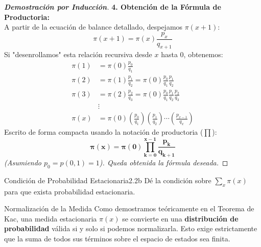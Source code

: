 \documentclass[10pt,a4paper]{article}
\begin{document}
\begin{proof}[\textbf{Demostración por Inducción}]
    \vspace{3mm}
    \textbf{4. Obtención de la Fórmula de Productoria:} \\
    A partir de la ecuación de balance detallado, despejamos $\pi(x+1)$:
    \[ \pi(x+1) = \pi(x) \frac{p_x}{q_{x+1}} \]
    Si "desenrollamos" esta relación recursiva desde $x$ hasta $0$, obtenemos:
    \begin{align*}
        \pi(1) &= \pi(0) \frac{p_0}{q_1} \\
        \pi(2) &= \pi(1) \frac{p_1}{q_2} = \pi(0) \frac{p_0}{q_1} \frac{p_1}{q_2} \\
        \pi(3) &= \pi(2) \frac{p_2}{q_3} = \pi(0) \frac{p_0}{q_1} \frac{p_1}{q_2} \frac{p_2}{q_3} \\
        &\vdots \\
        \pi(x) &= \pi(0) \left( \frac{p_0}{q_1} \right) \left( \frac{p_1}{q_2} \right) \cdots \left( \frac{p_{x-1}}{q_x} \right)
    \end{align*}
    Escrito de forma compacta usando la notación de productoria ($\prod$):
    \[ \mathbf{\pi(x) = \pi(0) \prod_{k=0}^{x-1} \frac{p_k}{q_{k+1}}} \]
    \textit{(Asumiendo $p_0 = p(0,1) = 1$). Queda obtenida la fórmula deseada.}
\end{proof}

\newpage



\begin{ejercicio}{Condición de Probabilidad Estacionaria}{2.2b}
    Dé la condición sobre $\sum_x \pi(x)$ para que exista probabilidad estacionaria.
\end{ejercicio}

\vspace{2mm}

\begin{alerta}{Normalización de la Medida}
    Como demostramos teóricamente en el Teorema de Kac, una medida estacionaria $\pi(x)$ se convierte en una \textbf{distribución de probabilidad} válida si y solo si podemos normalizarla. Esto exige estrictamente que la suma de todos sus términos sobre el espacio de estados sea finita.
\end{alerta}

\vspace{5mm}
\end{document}
